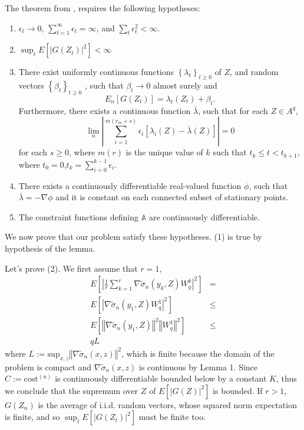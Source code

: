 \documentclass[letterpaper]{article}
\numberwithin{equation}{section}
\begin{document}
The theorem from \citet{kushner2003stochastic}, requires the following hypotheses:
\begin{enumerate}
\item $\epsilon_{t}\rightarrow0$, $\sum_{t=1}^{\infty}\epsilon_{t}=\infty$,
and $\sum_{t}\epsilon_{t}^{2}<\infty$.
\item $\sup_{t}E\left[\left|G\left(Z_{t}\right)\right|^{2}\right]<\infty$
\item There exist uniformly continuous functions $\left\{ \lambda_{t}\right\} _{t\geq0}$
of $Z$, and random vectors $\left\{ \beta_{t}\right\} _{t\geq0}$
, such that $\beta_{t}\rightarrow0$ almost surely and
\[
E_{n}\left[G\left(Z_{t}\right)\right]=\lambda_{t}\left(Z_{t}\right)+\beta_{t}.
\]
Furthermore, there exists a continuous function $\bar{\lambda}$,
such that for each $Z\in A^{q}$,
\[
\lim_{n}\left|\sum_{i=1}^{m\left(r_{m}+s\right)}\epsilon_{i}\left[\lambda_{i}\left(Z\right)-\bar{\lambda}\left(Z\right)\right]\right|=0
\]
for each $s\geq0$, where $m\left(r\right)$ is the unique value of
$k$ such that $t_{k}\leq t<t_{k+1}$, where $t_{0}=0$,$t_{k}=\sum_{i=0}^{k-1}\epsilon_{i}$.
\item There exists a continuously differentiable real-valued function $\phi$,
such that $\bar{\lambda}=-\nabla\phi$ and it is constant on each
connected subset of stationary points.
\item The constraint functions defining $\mathbb{A}$ are continuously differentiable.
\end{enumerate}
We now prove that our problem satisfy these hypotheses. (1) is true
by hypothesis of the lemma. 

Let's prove (2). We first assume that $r=1$, 
\begin{eqnarray*}
E\left[\left|\frac{1}{r}\sum_{k=1}^{r}\nabla\tilde{\sigma}_{n}\left(y_{k},Z\right)W_{q}^{k}\right|^{2}\right] & =\\
E\left[\left|\nabla\tilde{\sigma}_{n}\left(y_{1},Z\right)W_{q}^{1}\right|^{2}\right] & \leq\\
E\left[\left\Vert \nabla\tilde{\sigma}_{n}\left(y_{1},Z\right)\right\Vert ^{2}\left\Vert W_{q}^{1}\right\Vert ^{2}\right] & \leq\\
qL
\end{eqnarray*}
where $L:=\mbox{sup}_{x,z}\left\Vert \nabla\tilde{\sigma}_{n}\left(x,z\right)\right\Vert ^{2}$,
which is finite because the domain of the problem is compact and $\nabla\tilde{\sigma}_{n}\left(x,z\right)$
is continuous by Lemma 1. Since $C:=\mbox{cost}^{\left(n\right)}$ is continuously
differentiable bounded below by a constant $K$, thus we conclude
that the supremum over $Z$ of $E\left[\left|G\left(Z\right)\right|^{2}\right]$
is bounded. If $r>1$, $G\left(Z_{n}\right)$ is the average of i.i.d.
random vectors, whose squared norm expectation is finite, and so $\sup_{t}E\left[\left|G\left(Z_{t}\right)\right|^{2}\right]$
must be finite too.
\end{document}
